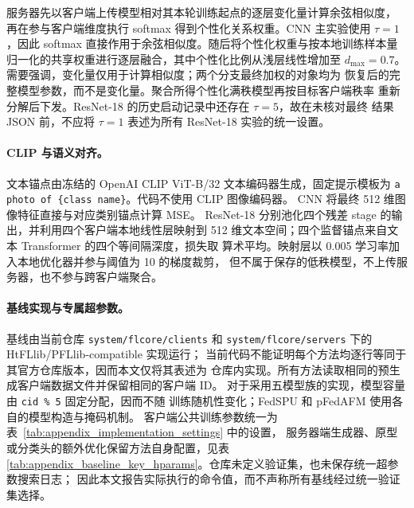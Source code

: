 服务器先以客户端上传模型相对其本轮训练起点的逐层变化量计算余弦相似度，
再在参与客户端维度执行 softmax 得到个性化关系权重。CNN 主实验使用
$\tau=1$，因此 softmax 直接作用于余弦相似度。随后将个性化权重与按本地训练样本量
归一化的共享权重进行逐层融合，其中个性化比例从浅层线性增加至
$d_{\max}=0.7$。需要强调，变化量仅用于计算相似度；两个分支最终加权的对象均为
恢复后的完整模型参数，而不是变化量。聚合所得个性化满秩模型再按目标客户端秩率
重新分解后下发。ResNet-18 的历史启动记录中还存在 $\tau=5$，故在未核对最终
结果 JSON 前，不应将 $\tau=1$ 表述为所有 ResNet-18 实验的统一设置。

\paragraph{CLIP 与语义对齐。}
文本锚点由冻结的 OpenAI CLIP ViT-B/32 文本编码器生成，固定提示模板为
\texttt{a photo of \{class name\}}。代码不使用 CLIP 图像编码器。
CNN 将最终 512 维图像特征直接与对应类别锚点计算 MSE。
ResNet-18 分别池化四个残差 stage 的输出，并利用四个客户端本地线性层映射到
512 维文本空间；四个监督锚点来自文本 Transformer 的四个等间隔深度，损失取
算术平均。映射层以 0.005 学习率加入本地优化器并参与阈值为 10 的梯度裁剪，
但不属于保存的低秩模型，不上传服务器，也不参与跨客户端聚合。

\paragraph{基线实现与专属超参数。}
基线由当前仓库 \texttt{system/flcore/clients} 和
\texttt{system/flcore/servers} 下的 HtFLlib/PFLlib-compatible 实现运行；
当前代码不能证明每个方法均逐行等同于其官方仓库版本，因而本文仅将其表述为
仓库内实现。所有方法读取相同的预生成客户端数据文件并保留相同的客户端 ID。
对于采用五模型族的实现，模型容量由 \texttt{cid \% 5} 固定分配，因而不随
训练随机性变化；FedSPU 和 pFedAFM 使用各自的模型构造与掩码机制。
客户端公共训练参数统一为表~\ref{tab:appendix_implementation_settings} 中的设置，
服务器端生成器、原型或分类头的额外优化保留方法自身配置，见表
\ref{tab:appendix_baseline_key_hparams}。仓库未定义验证集，也未保存统一超参数搜索日志；
因此本文报告实际执行的命令值，而不声称所有基线经过统一验证集选择。

